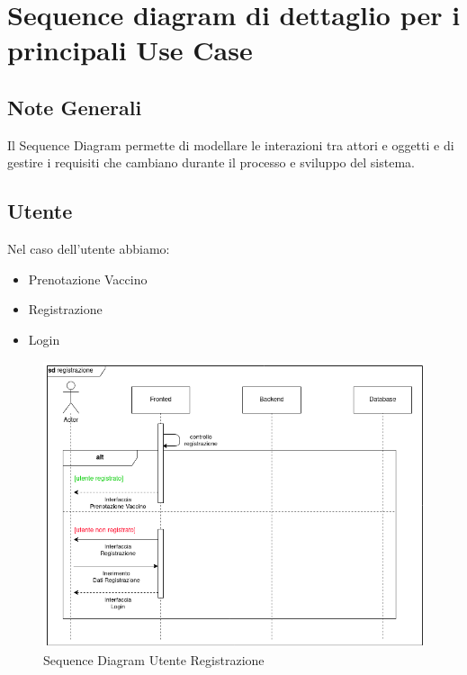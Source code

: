 \documentclass[a4paper,12pt,openany,oneside]{book}
\begin{document}
\section{Sequence diagram di dettaglio per i principali Use Case}
\subsection*{Note Generali}
Il Sequence Diagram permette di modellare le interazioni tra attori e oggetti e di gestire i requisiti che cambiano durante il processo e sviluppo del sistema.
\subsection{Utente}
Nel caso dell'utente abbiamo:
\begin{itemize}
  \item Prenotazione Vaccino
  \item Registrazione
  \item Login
\end{itemize}
\begin{figure}[h] 
\centering
\includegraphics[width=0.8\columnwidth]{Registration.png} 
\caption{Sequence Diagram Utente Registrazione} 
\end{figure}
\newpage
\end{document}
